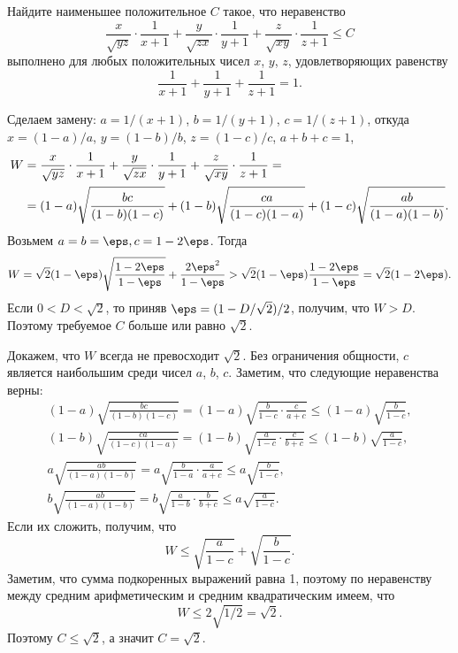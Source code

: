 Найдите наименьшее положительное $C$ такое, что неравенство
\[
    \frac{x}{\sqrt{yz}} \cdot \frac{1}{x+1}
    +
    \frac{y}{\sqrt{zx}} \cdot \frac{1}{y+1}
    +
    \frac{z}{\sqrt{xy}} \cdot \frac{1}{z+1}
\leq
    C
\]
выполнено для любых положительных чисел $x$, $y$, $z$, удовлетворяющих
равенству
\[
    \frac{1}{x+1} + \frac{1}{y+1} + \frac{1}{z+1}
=
    1
.\]

\solution
Сделаем замену:
$a = 1 / (x + 1)$, $b = 1 / (y + 1)$,  $c = 1 / (z + 1)$, откуда
$x = (1 - a) / a$, $y = (1 - b) / b$, $z = (1 - c) / c$,
$a + b + c = 1$,
\begin{align*}
    W
={}&
    \frac{x}{\sqrt{y z}} \cdot \frac{1}{x + 1}
    +
    \frac{y}{\sqrt{z x}} \cdot \frac{1}{y + 1}
    +
    \frac{z}{\sqrt{x y}} \cdot \frac{1}{z + 1}
=\\={}&
    (1 - a) \sqrt{\frac{b c \mathstrut}{(1 - b) (1 - c)}}
    +
    (1 - b) \sqrt{\frac{c a \mathstrut}{(1 - c) (1 - a)}}
    +
    (1 - c) \sqrt{\frac{a b \mathstrut}{(1 - a) (1 - b)}}
.\end{align*}
Возьмем $a = b = \eps, c = 1 - 2 \eps$.
Тогда 
\[
    W
=
    \sqrt{2} (1 - \eps) \sqrt{\frac{1 - 2 \eps}{1 - \eps}}
    +
    \frac{2{\eps}^2}{1 - \eps}
>
    \sqrt{2} (1 - \eps) \frac{1 - 2 \eps}{1 - \eps}
=
    \sqrt{2} (1 - 2 \eps).
\]
Если $0 < D < \sqrt{2}$, то приняв $\eps = (1 - D / \sqrt{2}) / 2$,
получим, что $W > D$.
Поэтому требуемое $C$ больше или равно $\sqrt{2}$.
\par
Докажем, что $W$ всегда не превосходит $\sqrt{2}$.
Без ограничения общности, $c$ является наибольшим среди чисел $a$, $b$, $c$.
Заметим, что следующие неравенства верны:
\begin{gather*}
    (1 - a) \sqrt{\frac{b c}{(1 - b) (1 - c)}}
=
    (1 - a) \sqrt{\frac{b}{1 - c} \cdot \frac{c}{a + c}}
\leq
    (1 - a) \sqrt{\frac{b}{1 - c}}
,\\
    (1 - b) \sqrt{\frac{c a}{(1 - c) (1 - a)}}
=
    (1 - b) \sqrt{\frac{a}{1 - c} \cdot \frac{c}{b + c}}
\leq
    (1 - b) \sqrt{\frac{a}{1 - c}}
,\\
    a \sqrt{\frac{a b}{(1 - a) (1 - b)}}
=
    a \sqrt{\frac{b}{1 - a} \cdot \frac{a}{a + c}}
\leq
    a \sqrt{\frac{b}{1 - c}}
,\\
    b \sqrt{\frac{a b}{(1 - a) (1 - b)}}
=
    b \sqrt{\frac{a}{1 - b} \cdot \frac{b}{b + c}}
\leq
    a \sqrt{\frac{a}{1 - c}}
.\end{gather*}
Если их сложить, получим, что 
\[
    W
\leq
    \sqrt{\frac{a}{1 - c}} + \sqrt{\frac{b}{1 - c}}
.\]
Заметим, что сумма подкоренных выражений равна 1, поэтому по неравенству
между средним арифметическим и средним квадратическим имеем, что
\[
    W
\leq
    2 \sqrt{1 / 2}
=
    \sqrt{2}
.\]
Поэтому $C \leq \sqrt{2}$, а значит $C = \sqrt{2}$.  

